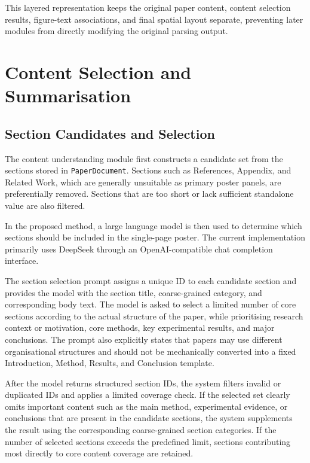 \documentclass[12pt,oneside]{report}
\begin{document}
\vspace{1em}

This layered representation keeps the original paper content, content selection results, figure-text associations, and final spatial layout separate, preventing later modules from directly modifying the original parsing output.

\section{Content Selection and Summarisation}

\subsection{Section Candidates and Selection}

The content understanding module first constructs a candidate set from the sections stored in \texttt{PaperDocument}. Sections such as References, Appendix, and Related Work, which are generally unsuitable as primary poster panels, are preferentially removed. Sections that are too short or lack sufficient standalone value are also filtered.

\vspace{1em}

In the proposed method, a large language model is then used to determine which sections should be included in the single-page poster. The current implementation primarily uses DeepSeek through an OpenAI-compatible chat completion interface.

\vspace{1em}

The section selection prompt assigns a unique ID to each candidate section and provides the model with the section title, coarse-grained category, and corresponding body text. The model is asked to select a limited number of core sections according to the actual structure of the paper, while prioritising research context or motivation, core methods, key experimental results, and major conclusions. The prompt also explicitly states that papers may use different organisational structures and should not be mechanically converted into a fixed Introduction, Method, Results, and Conclusion template.

\vspace{1em}

After the model returns structured section IDs, the system filters invalid or duplicated IDs and applies a limited coverage check. If the selected set clearly omits important content such as the main method, experimental evidence, or conclusions that are present in the candidate sections, the system supplements the result using the corresponding coarse-grained section categories. If the number of selected sections exceeds the predefined limit, sections contributing most directly to core content coverage are retained.
\end{document}
